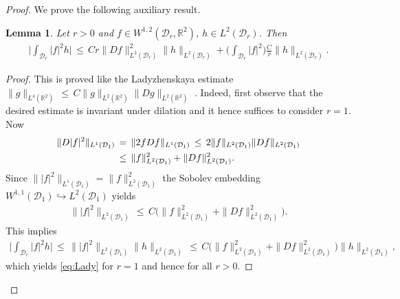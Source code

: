 \documentclass[reqno,makeidx,12pt]{amsart}
\theoremstyle{note}
\newtheorem{lemma}{Lemma}
\theoremstyle{definition}
\begin{document}
\begin{proof}
We prove the following auxiliary result.
\begin{lemma}
Let $r>0$ and $f\in W^{1,2}({\mathcal{D}}_r,{\mathbb R}^2)$, $h\in L^2({\mathcal{D}}_r)$. Then
\begin{gather}
	\Big| \int_{{\mathcal{D}}_r} |f|^2h \Big| \,\leq\, Cr \|D f\|_{L^2({\mathcal{D}}_r)}^2\|h\|_{L^2({\mathcal{D}}_r)} + \Big(\int_{{\mathcal{D}}_r} |f|^2\Big)\frac{C}{r}\|h\|_{L^2({\mathcal{D}}_r)}. \label{eq:Lady}
\end{gather}
\end{lemma}
\begin{proof}
This is proved like the Ladyzhenskaya estimate $\|g\|_{L^4({\mathbb R}^2)}\,\leq\, C \|g\|_{L^2({\mathbb R}^2)}\|Dg\|_{L^2({\mathbb R}^2)}$ \cite{Lady59}. Indeed, first observe that the desired estimate is invariant under dilation and it hence suffices to consider $r=1$. Now
\begin{align*}
	\|D |f|^2\|_{L^1({\mathcal{D}}_1)} \,&=\, \|2f Df\|_{L^1({\mathcal{D}}_1)} \,\leq\, 2\|f\|_{L^2({\mathcal{D}}_1)}\|Df\|_{L^2({\mathcal{D}}_1)} \notag\\
	&\leq\, \|f\|_{L^2({\mathcal{D}}_1)}^2 + \|Df\|_{L^2({\mathcal{D}}_1)}^2. 
\end{align*}
Since $\| |f|^2 \|_{L^1({\mathcal{D}}_1)}=\|f\|_{L^2({\mathcal{D}}_1)}^2$ the Sobolev embedding $W^{1,1}({\mathcal{D}}_1)\hookrightarrow L^2({\mathcal{D}}_1)$ yields
\begin{align*}
	\| |f|^2 \|_{L^2({\mathcal{D}}_1)} \,\leq\, C\Big(\|f\|_{L^2({\mathcal{D}}_1)}^2 + \|Df\|_{L^2({\mathcal{D}}_1)}^2\Big).
\end{align*}
This implies 
\begin{gather*}
	\Big| \int_{{\mathcal{D}}_r} |f|^2h \Big| \,\leq\, \| |f|^2\|_{L^2({\mathcal{D}}_1)} \|h\|_{L^2({\mathcal{D}}_1)} \,\leq\,  C\Big(\|f\|_{L^2({\mathcal{D}}_1)}^2 + \|Df\|_{L^2({\mathcal{D}}_1)}^2\Big)\|h\|_{L^2({\mathcal{D}}_1)},
\end{gather*}
which yields \eqref{eq:Lady} for $r=1$ and hence for all $r>0$. 
\end{proof}


\end{proof}
\end{document}
